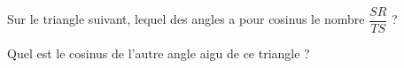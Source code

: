
\begin{exercice}\label{exo2smath-0234}

    Sur le triangle suivant, lequel des angles a pour cosinus le nombre \( \dfrac{ SR }{ TS }\) ?

\begin{center}
    
\end{center}

Quel est le cosinus de l'autre angle aigu de ce triangle ?

\end{exercice}
